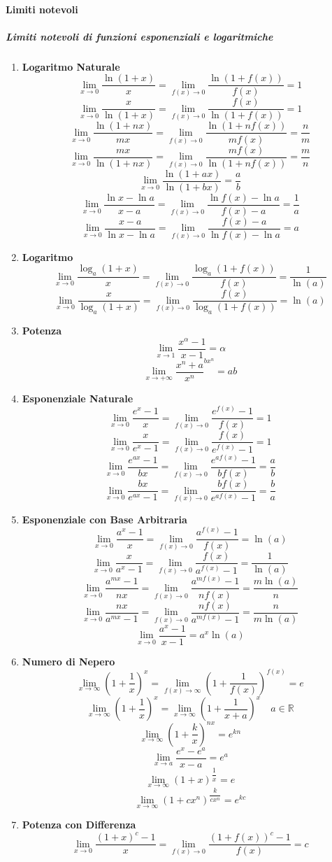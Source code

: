 \documentclass{article}
\theoremstyle{plain}
\theoremstyle{definition}
\theoremstyle{remark}
\begin{document}
\paragraph{Limiti notevoli}
\subparagraph{Limiti notevoli di funzioni esponenziali e logaritmiche}
\begin{multicols}{2}
\begin{enumerate}
    \item[] \textbf{Logaritmo Naturale}
    \[\lim_{x\to0}\dfrac{\ln(1+x)}{x}=\lim_{f(x)\to0}\dfrac{\ln(1+f(x))}{f(x)}=1\]
    \[\lim_{x\to0}\dfrac{x}{\ln(1+x)}=\lim_{f(x)\to0}\dfrac{f(x)}{\ln(1+f(x))}=1\]
    \[\lim_{x\to0}\dfrac{\ln(1+nx)}{mx}=\lim_{f(x)\to0}\dfrac{\ln(1+nf(x))}{mf(x)}=\dfrac{n}{m}\]
    \[\lim_{x\to0}\dfrac{mx}{\ln(1+nx)}=\lim_{f(x)\to0}\dfrac{mf(x)}{\ln(1+nf(x))}=\dfrac{m}{n}\]
    \[\lim_{x\to0}\dfrac{\ln(1+ax)}{\ln(1+bx)}=\dfrac{a}{b}\]
    \[\lim_{x\to0}\dfrac{\ln x-\ln a}{x-a}=\lim_{f(x)\to0}\dfrac{\ln f(x)-\ln a}{f(x)-a}=\dfrac{1}{a}\]
    \[\lim_{x\to0}\dfrac{x-a}{\ln x-\ln a}=\lim_{f(x)\to0}\dfrac{f(x)-a}{\ln f(x)-\ln a}=a\]
    \item[] \textbf{Logaritmo}
    \[\lim_{x\to0}\dfrac{\log_a(1+x)}{x}=\lim_{f(x)\to0}\dfrac{\log_a(1+f(x))}{f(x)}=\dfrac{1}{\ln(a)}\]
    \[\lim_{x\to0}\dfrac{x}{\log_a(1+x)}=\lim_{f(x)\to0}\dfrac{f(x)}{\log_a(1+f(x))}=\ln(a)\]
    \item[] \textbf{Potenza}
    \[\lim_{x\to1}\dfrac{x^\alpha-1}{x-1}=\alpha\]
    \[\lim_{x\to+\infty}\dfrac{x^n+a}{x^n}^{bx^n}=ab\] 
    \item[] \textbf{Esponenziale Naturale}
    \[\lim_{x\to0}\dfrac{e^x-1}{x}=\lim_{f(x)\to0}\dfrac{e^{f(x)}-1}{f(x)}=1\]
    \[\lim_{x\to0}\dfrac{x}{e^x-1}=\lim_{f(x)\to0}\dfrac{f(x)}{e^{f(x)}-1}=1\]
    \[\lim_{x\to0}\dfrac{e^{ax}-1}{bx}=\lim_{f(x)\to0}\dfrac{e^{af(x)}-1}{bf(x)}=\dfrac{a}{b}\]
    \[\lim_{x\to0}\dfrac{bx}{e^{ax}-1}=\lim_{f(x)\to0}\dfrac{bf(x)}{e^{af(x)}-1}=\dfrac{b}{a}\]
    \item[] \textbf{Esponenziale con Base Arbitraria}
    \[\lim_{x\to0}\dfrac{a^x-1}{x}=\lim_{f(x)\to0}\dfrac{a^{f(x)}-1}{f(x)}=\ln(a)\]
    \[\lim_{x\to0}\dfrac{x}{a^x-1}=\lim_{f(x)\to0}\dfrac{f(x)}{a^{f(x)}-1}=\dfrac{1}{\ln(a)}\]
    \[\lim_{x\to0}\dfrac{a^{mx}-1}{nx}=\lim_{f(x)\to0}\dfrac{a^{mf(x)}-1}{nf(x)}=\dfrac{m\ln(a)}{n}\]
    \[\lim_{x\to0}\dfrac{nx}{a^{mx}-1}=\lim_{f(x)\to0}\dfrac{nf(x)}{a^{mf(x)}-1}=\dfrac{n}{m\ln(a)}\]
    \[\lim_{x\to0}\dfrac{a^x-1}{x-1}=a^x\ln(a)\]
    \item[] \textbf{Numero di Nepero}
    \[\lim_{x\to\infty}\left(1+\dfrac{1}{x}\right)^x=\lim_{f(x)\to\infty}\left(1+\dfrac{1}{f(x)}\right)^{f(x)}=e\]
    \[\lim_{x\to\infty}\left(1+\dfrac{1}{x}\right)^x=\lim_{x\to\infty}\left(1+\dfrac{1}{x+a}\right)^x\quad a\in\mathbb{R}\]
    \[\lim_{x\to\infty}\left(1+\dfrac{k}{x}\right)^{nx}=e^{kn}\] 
    \[\lim_{x\to a}\dfrac{e^x-e^a}{x-a}=e^a\]
    \[\lim_{x\to\infty}(1+x)^{\dfrac{1}{x}}=e\]
    \[\lim_{x\to\infty}(1+cx^n)^{\dfrac{k}{cx^n}}=e^{kc}\]
    \item[] \textbf{Potenza con Differenza}
    \[\lim_{x\to0}\dfrac{(1+x)^c-1}{x}=\lim_{f(x)\to0}\dfrac{(1+f(x))^c-1}{f(x)}=c\]
\end{enumerate}
\end{multicols}
\end{document}
